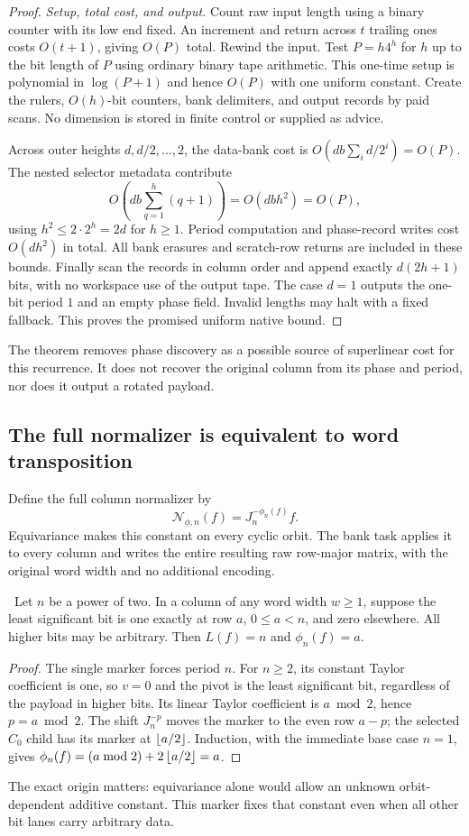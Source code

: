 \begin{proof}
\emph{Setup, total cost, and output.}
Count raw input length using a binary counter with its low end fixed.
An increment and return across $t$ trailing ones costs $O(t+1)$, giving
$O(P)$ total. Rewind the input. Test $P=h4^h$ for $h$ up to the bit
length of $P$ using ordinary binary tape arithmetic. This one-time setup
is polynomial in $\log(P+1)$ and hence $O(P)$ with one uniform constant.
Create the rulers, $O(h)$-bit counters, bank delimiters, and output records
by paid scans. No dimension is stored in finite control or supplied as advice.

Across outer heights $d,d/2,\ldots,2$, the data-bank cost is
$O(db\sum_i d/2^i)=O(P)$. The nested selector metadata contribute
\[
 O\left(db\sum_{q=1}^h(q+1)\right)=O(dbh^2)=O(P),
\]
using $h^2\le2\cdot2^h=2d$ for $h\ge1$.
Period computation and phase-record writes cost $O(dh^2)$ in total.
All bank erasures and scratch-row returns are included in these bounds.
Finally scan the records in column order and append exactly $d(2h+1)$
bits, with no workspace use of the output tape. The case $d=1$ outputs
the one-bit period $1$ and an empty phase field. Invalid lengths may halt
with a fixed fallback. This proves the promised uniform native bound.
\end{proof}

The theorem removes phase discovery as a possible source of superlinear
cost for this recurrence. It does not recover the original column from
its phase and period, nor does it output a rotated payload.

\subsection{The full normalizer is equivalent to word transposition}
Define the full column normalizer by
\[
 \mathcal N_{\phi,n}(f)=J_n^{-\phi_n(f)}f.
\]
Equivariance makes this constant on every cyclic orbit. The bank task
applies it to every column and writes the entire resulting raw row-major
matrix, with the original word width and no additional encoding.

\begin{lemma}\label{lem:phase-marker}
\notformalized\ Let $n$ be a power of two. In a column of any word
width $w\ge1$, suppose the least significant bit is one exactly at
row $a$, $0\le a<n$, and zero elsewhere. All higher bits may be
arbitrary. Then $L(f)=n$ and $\phi_n(f)=a$.
\end{lemma}
\begin{proof}
The single marker forces period $n$. For $n\ge2$, its constant Taylor
coefficient is one, so $v=0$ and the pivot is the least significant bit,
regardless of the payload in higher bits. Its linear Taylor coefficient
is $a\bmod2$, hence $p=a\bmod2$. The shift $J_n^{-p}$ moves the
marker to the even row $a-p$; the selected $C_0$ child has its marker
at $\left\lfloor a/2\right\rfloor$. Induction, with the immediate base case $n=1$, gives
$\phi_n(f)=(a\bmod2)+2\left\lfloor a/2\right\rfloor=a$.
\end{proof}
The exact origin matters: equivariance alone would allow an unknown
orbit-dependent additive constant. This marker fixes that constant even
when all other bit lanes carry arbitrary data.

